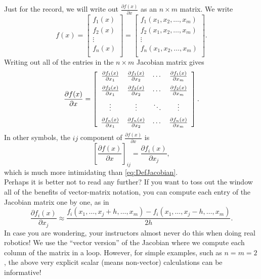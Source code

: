  \vspace*{.2cm}

Just for the record, we will write out $\frac{\partial f(x)}{\partial x}$ as an $n \times m$ matrix. We write
$$f(x) = \left[
\begin{array}{c}
f_1(x) \\
f_2(x)\\
\vdots \\
f_n(x)\\
\end{array}
\right] =  \left[ \begin{array}{c}
f_1(x_1, x_2, \dots, x_m) \\
f_2(x_1, x_2, \dots, x_m)\\
\vdots \\
f_n(x_1, x_2, \dots, x_m)\\
\end{array}
\right].$$
Writing out all of the entries in the $n \times m$ Jacobian matrix gives 
\begin{equation}
    \label{eq:VectorFunctions03}
    \frac{\partial f(x)}{\partial x} = \left[\begin{array}{cccc}
      \frac{\partial f_1(x)}{\partial x_1} & \frac{\partial f_1(x)}{\partial x_2} & \cdots & \frac{\partial f_1(x)}{\partial x_m} \medskip \\
      \frac{\partial f_2(x)}{\partial x_1} & \frac{\partial f_2(x)}{\partial x_2} & \cdots & \frac{\partial f_2(x)}{\partial x_m} \medskip \\
      \vdots & \vdots & \ddots & \vdots \medskip \\
      \frac{\partial f_n(x)}{\partial x_1} & \frac{\partial f_n(x)}{\partial x_2} & \cdots & \frac{\partial f_n(x)}{\partial x_m} 
    \end{array} \right].
\end{equation}
In other symbols, the $ij$ component of $\frac{\partial f(x)}{\partial x}$ is
$$ \left[ \frac{\partial f(x)}{\partial x}  \right]_{ij} = \frac{\partial f_i(x)}{\partial x_j}, $$
which is much more intimidating than \eqref{eq:DefJacobian}. \\

Perhaps it is better not to read any further? If you want to toss out the window all of the benefits of vector-matrix notation, you can compute each entry of the Jacobian matrix one by one, as in 
\begin{equation}
    \label{eq:VectorFunctions03B}
    \frac{\partial f_i(x)}{\partial x_j} \approx \frac{f_i(x_1, \ldots, x_j+h, \ldots, x_m) - f_i(x_1, \ldots, x_j-h, \ldots, x_m)}{2h}. 
    \end{equation}
In case you are wondering, your instructors almost never do this when doing real robotics! We use the ``vector version'' of the Jacobian where we compute each column of the matrix in a loop. However, for simple examples, such as $n=m=2$, the above very explicit scalar (means non-vector) calculations can be informative!

